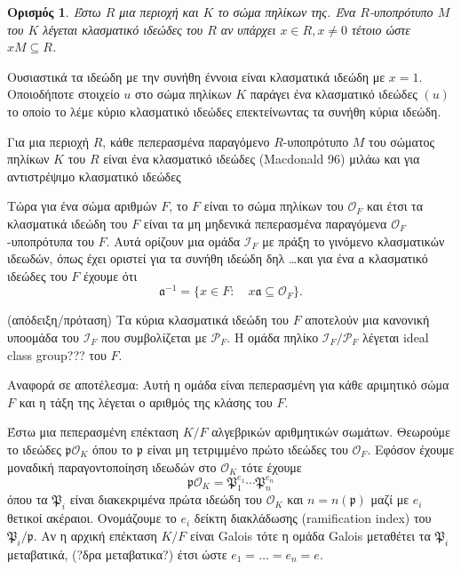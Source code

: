 \documentclass[oneside,a4paper]{article}
\newtheorem*{defn}{Ορισμός}
\newcommand {\tl}{\textlatin}
\begin{document}
\begin{defn}
	Έστω $R$ μια περιοχή και $K$ το σώμα πηλίκων της. Ένα $R$-υποπρότυπο $M$ του $K$ λέγεται κλασματικό ιδεώδες του $R$ αν υπάρχει $x \in R, x\neq 0$ τέτοιο ώστε $xM \subseteq R$. 
\end{defn}
Ουσιαστικά τα ιδεώδη με την συνήθη έννοια είναι κλασματικά ιδεώδη με $x=1$. Οποιοδήποτε στοιχείο $u$ στο σώμα πηλίκων $K$ παράγει ένα κλασματικό ιδεώδες $(u)$ το οποίο το λέμε κύριο κλασματικό ιδεώδες επεκτείνωντας τα συνήθη κύρια ιδεώδη.


Για μια περιοχή $R$, κάθε πεπερασμένα παραγόμενο $R$-υποπρότυπο $M$ του σώματος πηλίκων $K$ του $R$ είναι ένα κλασματικό ιδεώδες
(\tl{Macdonald 96}) μιλάω και για αντιστρέψιμο κλασματικό ιδεώδες

Τώρα για ένα σώμα αριθμών $F$, το $F$ είναι το σώμα πηλίκων του $\mathcal{O}_F$ και έτσι τα κλασματικά ιδεώδη του $F$ είναι τα μη μηδενικά πεπερασμένα παραγόμενα $\mathcal{O}_F$-υποπρότυπα του $F$. Αυτά ορίζουν μια ομάδα $\mathcal{I}_F$ με πράξη το γινόμενο κλασματικών ιδεωδών, όπως έχει οριστεί για τα συνήθη ιδεώδη δηλ \dots και για ένα $\mathfrak{a}$ κλασματικό ιδεώδες του $F$ έχουμε ότι $$\mathfrak{a}^{-1} = \{x \in F: \quad x\mathfrak{a} \subseteq \mathcal{O}_F\}.$$


(απόδειξη/πρόταση) Τα κύρια κλασματικά ιδεώδη του $F$ αποτελούν μια κανονική υποομάδα του $\mathcal{I}_F$ που συμβολίζεται με $\mathcal{P}_F$. Η ομάδα πηλίκο $\mathcal{I}_F / \mathcal{P}_F$ λέγεται \tl{ideal class group???} του $F$.

Αναφορά σε αποτέλεσμα: Αυτή η ομάδα είναι πεπερασμένη για κάθε αριμητικό σώμα $F$ και η τάξη της λέγεται ο αριθμός της κλάσης του $F$.


Έστω μια πεπερασμένη επέκταση $K/F$ αλγεβρικών αριθμητικών σωμάτων. Θεωρούμε το ιδεώδες $\mathfrak{p} \mathcal{O}_K$ όπου το $\mathfrak{p}$ είναι μη τετριμμένο πρώτο ιδεώδες του $\mathcal{O}_F$. Εφόσον έχουμε μοναδική παραγοντοποίηση ιδεωδών στο $\mathcal{O}_K$ τότε έχουμε $$\mathfrak{p} \mathcal{O}_K = \mathfrak{P}^{e_1}_1 \cdots \mathfrak{P}^{e_n}_n$$
όπου τα $\mathfrak{P}_i$ είναι διακεκριμένα πρώτα ιδεώδη του $\mathcal{O}_K$ και $n = n(\mathfrak{p})$ μαζί με $e_i$ θετικοί ακέραιοι. Ονομάζουμε το $e_i$ δείκτη διακλάδωσης (\tl{ramification index}) του $\mathfrak{P}_i/\mathfrak{p}$. Αν η αρχική επέκταση $K/F$ είναι \tl{Galois} τότε η ομάδα \tl{Galois} μεταθέτει τα $\mathfrak{P}_i$ μεταβατικά, (?δρα μεταβατικα?) έτσι ώστε $e_1 = \ldots = e_n = e$.
\end{document}
